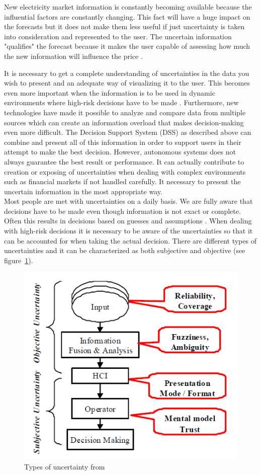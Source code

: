 New electricity market information is constantly becoming available because the influential factors are constantly changing. This fact will have a huge impact on the forecasts but it does not make them less useful if just uncertainty is taken into consideration and represented to the user. The uncertain information "qualifies" the forecast because it makes the user capable of assessing how much the new information will influence the price \cite{EnergyPriceForecasting}.
  
It is necessary to get a complete understanding of uncertainties in the data you wish to present and an adequate way of visualizing it to the user. This becomes even more important when the information is to be used in dynamic environments where high-risk decisions have to be made \cite{UncertainInformation}. Furthermore, new technologies have made it possible to analyze and compare data from multiple sources which can create an information overload that makes decision-making even more difficult. The Decision Support System (DSS) as described above can combine and present all of this information in order to support users in their attempt to make the best decision. However, autonomous systems does not always guarantee the best result or performance. It can actually contribute to creation or exposing of uncertainties when dealing with complex environments such as financial markets \cite{UncertainInformation} if not handled carefully. It necessary to present the uncertain information in the most appropriate way.
\\[0.5cm]
Most people are met with uncertainties on a daily basis. We are fully aware that decisions have to be made even though information is not exact or complete. Often this results in decisions based on guesses and assumptions \cite{UncertainInformation}. When dealing with high-risk decisions it is necessary to be aware of the uncertainties so that it can be accounted for when taking the actual decision. 
There are different types of uncertainties and it can be characterized as both subjective and objective (see figure~\ref{fig:typesOfUncertainty}). 
\begin{figure}[h!]
\centering
\includegraphics[width=0.7\linewidth,natwidth=898,natheight=587]{billeder/TypesOfUncertainInformation.png}
\caption{Types of uncertainty from \cite{UncertainInformation}}
\label{fig:typesOfUncertainty}
\end{figure}  

